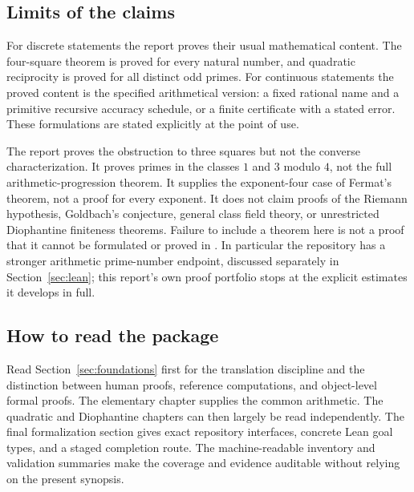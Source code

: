 \subsection*{Limits of the claims}
For discrete statements the report proves their usual mathematical content. The four-square theorem is proved for every natural number, and quadratic reciprocity is proved for all distinct odd primes. For continuous statements the proved content is the specified arithmetical version: a fixed rational name and a primitive recursive accuracy schedule, or a finite certificate with a stated error. These formulations are stated explicitly at the point of use.

The report proves the obstruction to three squares but not the converse characterization. It proves primes in the classes $1$ and $3$ modulo $4$, not the full arithmetic-progression theorem. It supplies the exponent-four case of Fermat's theorem, not a proof for every exponent. It does not claim proofs of the Riemann hypothesis, Goldbach's conjecture, general class field theory, or unrestricted Diophantine finiteness theorems. Failure to include a theorem here is not a proof that it cannot be formulated or proved in \ipra. In particular the repository has a stronger arithmetic prime-number endpoint, discussed separately in Section~\ref{sec:lean}; this report's own proof portfolio stops at the explicit estimates it develops in full.

\subsection*{How to read the package}
Read Section~\ref{sec:foundations} first for the translation discipline and the distinction between human proofs, reference computations, and object-level formal proofs. The elementary chapter supplies the common arithmetic. The quadratic and Diophantine chapters can then largely be read independently. The final formalization section gives exact repository interfaces, concrete Lean goal types, and a staged completion route. The machine-readable inventory and validation summaries make the coverage and evidence auditable without relying on the present synopsis.

